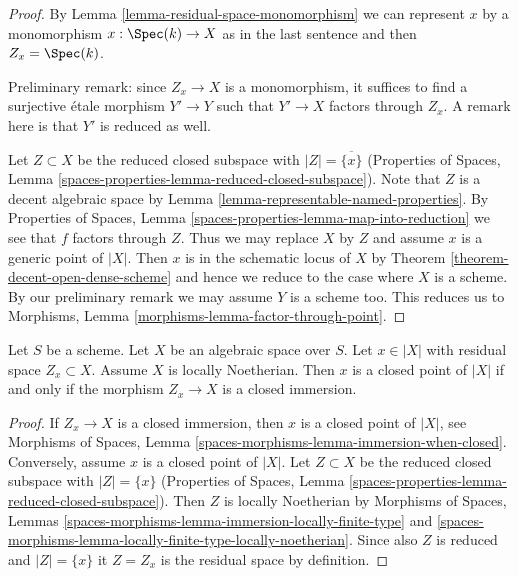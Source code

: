 \begin{proof}
By Lemma \ref{lemma-residual-space-monomorphism} we can represent
$x$ by a monomorphism $x : \Spec(k) \to X$ as in the last sentence
and then $Z_x = \Spec(k)$.

\medskip\noindent
Preliminary remark: since $Z_x \to X$ is a monomorphism, it suffices to find
a surjective \'etale morphism $Y' \to Y$ such that $Y' \to X$
factors through $Z_x$. A remark here is that $Y'$ is reduced as well.

\medskip\noindent
Let $Z \subset X$ be the reduced closed subspace with $|Z| = \overline{\{x\}}$
(Properties of Spaces,
Lemma \ref{spaces-properties-lemma-reduced-closed-subspace}).
Note that $Z$ is a decent algebraic space by
Lemma \ref{lemma-representable-named-properties}.
By Properties of Spaces, Lemma \ref{spaces-properties-lemma-map-into-reduction}
we see that $f$ factors through $Z$. Thus we may replace $X$
by $Z$ and assume $x$ is a generic point of $|X|$.
Then $x$ is in the schematic locus of $X$ by
Theorem \ref{theorem-decent-open-dense-scheme}
and hence we reduce to the case where $X$ is a scheme.
By our preliminary remark we may assume $Y$ is a scheme too.
This reduces us to Morphisms, Lemma \ref{morphisms-lemma-factor-through-point}.
\end{proof}

\begin{lemma}
\label{lemma-residual-space-closed}
Let $S$ be a scheme. Let $X$ be an algebraic space over $S$. Let $x \in |X|$
with residual space $Z_x \subset X$. Assume $X$ is locally Noetherian.
Then $x$ is a closed point of $|X|$ if and only if
the morphism $Z_x \to X$ is a closed immersion.
\end{lemma}

\begin{proof}
If $Z_x \to X$ is a closed immersion, then $x$ is a closed point of $|X|$, see
Morphisms of Spaces, Lemma \ref{spaces-morphisms-lemma-immersion-when-closed}.
Conversely, assume $x$ is a closed point of $|X|$.
Let $Z \subset X$ be the reduced closed subspace with $|Z| = \{x\}$
(Properties of Spaces,
Lemma \ref{spaces-properties-lemma-reduced-closed-subspace}).
Then $Z$ is locally Noetherian by Morphisms of Spaces, Lemmas
\ref{spaces-morphisms-lemma-immersion-locally-finite-type} and
\ref{spaces-morphisms-lemma-locally-finite-type-locally-noetherian}.
Since also $Z$ is reduced and $|Z| = \{x\}$ it $Z = Z_x$ is the
residual space by definition.
\end{proof}











